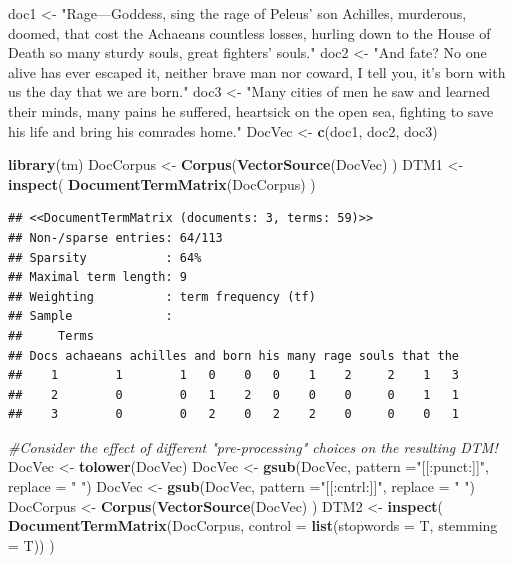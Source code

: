 \documentclass[]{book}
\newenvironment{Shaded}{\begin{snugshade}}{\end{snugshade}}
\newcommand{\KeywordTok}[1]{\textcolor[rgb]{0.13,0.29,0.53}{\textbf{#1}}}
\newcommand{\DataTypeTok}[1]{\textcolor[rgb]{0.13,0.29,0.53}{#1}}
\newcommand{\StringTok}[1]{\textcolor[rgb]{0.31,0.60,0.02}{#1}}
\newcommand{\CommentTok}[1]{\textcolor[rgb]{0.56,0.35,0.01}{\textit{#1}}}
\newcommand{\NormalTok}[1]{#1}
\theoremstyle{definition}
\theoremstyle{definition}
\theoremstyle{definition}
\theoremstyle{remark}
\begin{document}
\begin{Shaded}
\begin{Highlighting}[]
\NormalTok{doc1 <-}\StringTok{ "Rage---Goddess, sing the rage of Peleus’ son Achilles,}
\StringTok{    murderous, doomed, that cost the Achaeans countless losses,}
\StringTok{    hurling down to the House of Death so many sturdy souls,}
\StringTok{    great fighters’ souls."}
\NormalTok{doc2 <-}\StringTok{ "And fate? No one alive has ever escaped it,}
\StringTok{  neither brave man nor coward, I tell you, }
\StringTok{it's born with us the day that we are born."}
\NormalTok{doc3 <-}\StringTok{ "Many cities of men he saw and learned their minds,}
\StringTok{          many pains he suffered, heartsick on the open sea,}
\StringTok{          fighting to save his life and bring his comrades home."}
\NormalTok{DocVec <-}\StringTok{ }\KeywordTok{c}\NormalTok{(doc1, doc2, doc3)}

\KeywordTok{library}\NormalTok{(tm)}
\NormalTok{DocCorpus <-}\StringTok{ }\KeywordTok{Corpus}\NormalTok{(}\KeywordTok{VectorSource}\NormalTok{(DocVec) ) }
\NormalTok{DTM1 <-}\StringTok{  }\KeywordTok{inspect}\NormalTok{( }\KeywordTok{DocumentTermMatrix}\NormalTok{(DocCorpus) ) }
\end{Highlighting}
\end{Shaded}

\begin{verbatim}
## <<DocumentTermMatrix (documents: 3, terms: 59)>>
## Non-/sparse entries: 64/113
## Sparsity           : 64%
## Maximal term length: 9
## Weighting          : term frequency (tf)
## Sample             :
##     Terms
## Docs achaeans achilles and born his many rage souls that the
##    1        1        1   0    0   0    1    2     2    1   3
##    2        0        0   1    2   0    0    0     0    1   1
##    3        0        0   2    0   2    2    0     0    0   1
\end{verbatim}

\begin{Shaded}
\begin{Highlighting}[]
\CommentTok{#Consider the effect of different "pre-processing" choices on the resulting DTM!}
\NormalTok{DocVec <-}\StringTok{ }\KeywordTok{tolower}\NormalTok{(DocVec)}
\NormalTok{DocVec <-}\StringTok{ }\KeywordTok{gsub}\NormalTok{(DocVec, }\DataTypeTok{pattern =}\StringTok{"[[:punct:]]"}\NormalTok{, }\DataTypeTok{replace =} \StringTok{" "}\NormalTok{)}
\NormalTok{DocVec <-}\StringTok{ }\KeywordTok{gsub}\NormalTok{(DocVec, }\DataTypeTok{pattern =}\StringTok{"[[:cntrl:]]"}\NormalTok{, }\DataTypeTok{replace =} \StringTok{" "}\NormalTok{)}
\NormalTok{DocCorpus <-}\StringTok{ }\KeywordTok{Corpus}\NormalTok{(}\KeywordTok{VectorSource}\NormalTok{(DocVec) ) }
\NormalTok{DTM2 <-}\StringTok{  }\KeywordTok{inspect}\NormalTok{( }\KeywordTok{DocumentTermMatrix}\NormalTok{(DocCorpus, }\DataTypeTok{control =} \KeywordTok{list}\NormalTok{(}\DataTypeTok{stopwords =}\NormalTok{ T, }
                                                               \DataTypeTok{stemming =}\NormalTok{ T)) ) }
\end{Highlighting}
\end{Shaded}
\end{document}
